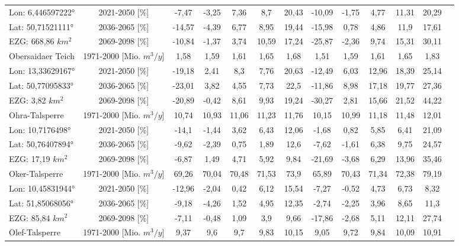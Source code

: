 \begin{longtable}{@{\extracolsep{\fill}}lc|ccccc||cccccc}
\cline{2-13} 
Lon: 6,446597222° & 2021-2050 [\%]  & -7,47 & -3,25 & 7,36 & 8,7 & 20,43 & -10,09 & -1,75 & 4,77 & 11,31 & 20,29 & \\ 
Lat: 50,71521111° & 2036-2065 [\%]  & -14,57 & -4,39 & 6,77 & 8,95 & 19,44 & -15,98 & 0,78 & 4,86 & 11,9 & 17,61 & \\ 
EZG: 668,86 $km^2$ & 2069-2098 [\%]  & -10,84 & -1,37 & 3,74 & 10,59 & 17,24 & -25,87 & -2,36 & 9,74 & 15,31 & 30,11 & \\ 
\hline 
Obersaidaer Teich & 1971-2000 [Mio. $m^3/y$]  & 1,58 & 1,59 & 1,61 & 1,65 & 1,68 & 1,51 & 1,59 & 1,61 & 1,65 & 1,83 & \\ 
\cline{2-13} 
Lon: 13,33629167° & 2021-2050 [\%]  & -19,18 & 2,41 & 8,3 & 7,76 & 20,63 & -12,49 & 6,03 & 12,96 & 18,39 & 25,14 & \\ 
Lat: 50,77095833° & 2036-2065 [\%]  & -23,01 & 3,82 & 4,55 & 7,73 & 22,5 & -11,86 & 8,98 & 17,18 & 19,77 & 27,36 & \\ 
EZG: 3,82 $km^2$ & 2069-2098 [\%]  & -20,89 & -0,42 & 8,61 & 9,93 & 19,24 & -30,27 & 2,81 & 15,66 & 21,52 & 44,22 & \\ 
\hline 
Ohra-Talsperre & 1971-2000 [Mio. $m^3/y$]  & 10,74 & 10,93 & 11,06 & 11,23 & 11,76 & 10,15 & 10,99 & 11,18 & 11,48 & 12,01 & \\ 
\cline{2-13} 
Lon: 10,7176498° & 2021-2050 [\%]  & -14,1 & -1,44 & 3,62 & 6,43 & 12,06 & -1,68 & 0,82 & 5,85 & 6,41 & 21,09 & \\ 
Lat: 50,76407894° & 2036-2065 [\%]  & -9,62 & -2,39 & 0,75 & 1,89 & 12,6 & -7,62 & -1,61 & 6,38 & 9,75 & 24,57 & \\ 
EZG: 17,19 $km^2$ & 2069-2098 [\%]  & -6,87 & 1,49 & 4,71 & 5,92 & 9,84 & -21,69 & -3,68 & 6,29 & 13,96 & 35,46 & \\ 
\hline 
Oker-Talsperre & 1971-2000 [Mio. $m^3/y$]  & 69,26 & 70,04 & 70,48 & 71,53 & 73,9 & 65,89 & 70,43 & 71,34 & 72,38 & 79,19 & \\ 
\cline{2-13} 
Lon: 10,45831944° & 2021-2050 [\%]  & -12,96 & -2,04 & 0,42 & 6,12 & 15,54 & -7,27 & -0,52 & 4,73 & 6,73 & 8,32 & \\ 
Lat: 51,85068056° & 2036-2065 [\%]  & -9,18 & -4,26 & 1,52 & 4,95 & 12,35 & -2,74 & -2,25 & 3,96 & 8,65 & 11,3 & \\ 
EZG: 85,84 $km^2$ & 2069-2098 [\%]  & -7,11 & -0,48 & 1,09 & 3,9 & 9,66 & -17,86 & -2,68 & 5,11 & 12,11 & 27,74 & \\ 
\hline 
Olef-Talsperre & 1971-2000 [Mio. $m^3/y$]  & 9,37 & 9,6 & 9,7 & 9,83 & 10,15 & 9,05 & 9,72 & 9,84 & 10,09 & 10,91 & \\ 

\end{longtable}
